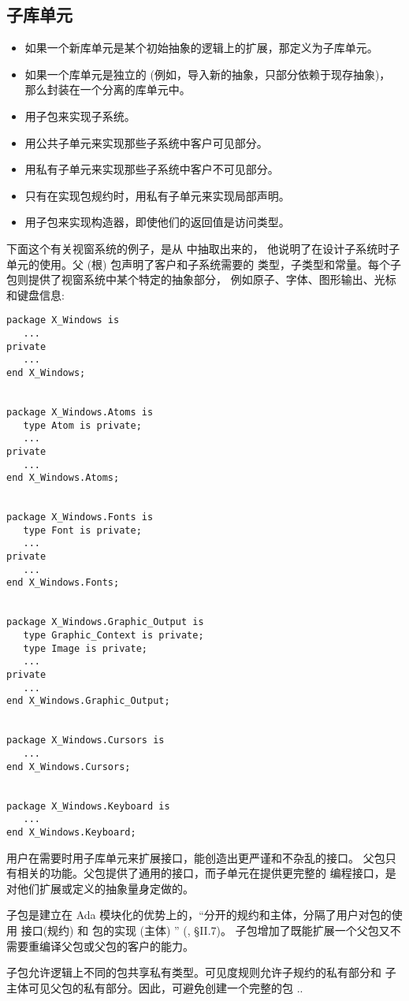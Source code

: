 \subsection{子库单元}
\label{c:prog-struct:high-level:child-lib-unit}
\begin{itemize}
\item 如果一个新库单元是某个初始抽象的逻辑上的扩展，那定义为子库单元。
\item 如果一个库单元是独立的 (例如，导入新的抽象，只部分依赖于现存抽象)，
那么封装在一个分离的库单元中。
\item 用子包来实现子系统。
\item 用公共子单元来实现那些子系统中客户可见部分。
\item 用私有子单元来实现那些子系统中客户不可见部分。
\item 只有在实现包规约时，用私有子单元来实现局部声明。
\item 用子包来实现构造器，即使他们的返回值是访问类型。
\end{itemize}

\begin{blockindent}
下面这个有关视窗系统的例子，是从 \cite{cohen93} 中抽取出来的，
他说明了在设计子系统时子单元的使用。父 (根) 包声明了客户和子系统需要的
类型，子类型和常量。每个子包则提供了视窗系统中某个特定的抽象部分，
例如原子、字体、图形输出、光标和键盘信息:
\begin{lstlisting}
package X_Windows is
   ...
private
   ...
end X_Windows;


package X_Windows.Atoms is
   type Atom is private;
   ...
private
   ...
end X_Windows.Atoms;


package X_Windows.Fonts is
   type Font is private;
   ...
private
   ...
end X_Windows.Fonts;


package X_Windows.Graphic_Output is
   type Graphic_Context is private;
   type Image is private;
   ...
private
   ...
end X_Windows.Graphic_Output;


package X_Windows.Cursors is
   ...
end X_Windows.Cursors;


package X_Windows.Keyboard is
   ...
end X_Windows.Keyboard;
\end{lstlisting}
\end{blockindent}

\begin{blockindent}
用户在需要时用子库单元来扩展接口，能创造出更严谨和不杂乱的接口。
父包只有相关的功能。父包提供了通用的接口，而子单元在提供更完整的
编程接口，是对他们扩展或定义的抽象量身定做的。

子包是建立在 Ada 模块化的优势上的，``分开的规约和主体，分隔了用户对包的使用
接口(规约) 和 包的实现 (主体) '' (\cite{rational95}, \S{}II.7)。
子包增加了既能扩展一个父包又不需要重编译父包或父包的客户的能力。

子包允许逻辑上不同的包共享私有类型。可见度规则允许子规约的私有部分和
子主体可见父包的私有部分。因此，可避免创建一个完整的包 ..

\end{blockindent}
